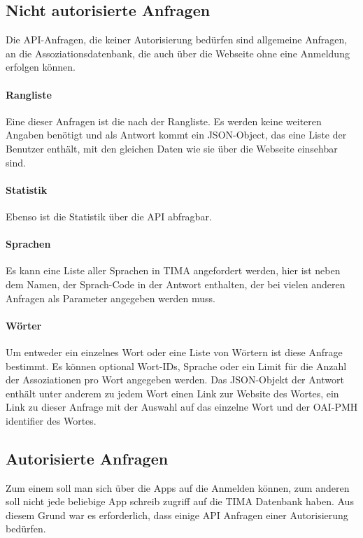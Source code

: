 \subsection{Nicht autorisierte Anfragen}
Die API-Anfragen, die keiner Autorisierung bedürfen sind allgemeine Anfragen, an die Assoziationsdatenbank, die auch über die Webseite ohne eine Anmeldung erfolgen können.

\paragraph{Rangliste} Eine dieser Anfragen ist die nach der Rangliste. Es werden keine weiteren Angaben benötigt und als Antwort kommt ein JSON-Object, das eine Liste der Benutzer enthält, mit den gleichen Daten wie sie über die Webseite einsehbar sind.

\paragraph{Statistik} Ebenso ist die Statistik über die API abfragbar.

\paragraph{Sprachen} Es kann eine Liste aller Sprachen in TIMA angefordert werden, hier ist neben dem Namen, der Sprach-Code in der Antwort enthalten, der bei vielen anderen Anfragen als Parameter angegeben werden muss.

\paragraph{Wörter} Um entweder ein einzelnes Wort oder eine Liste von Wörtern ist diese Anfrage bestimmt. Es können optional Wort-IDs, Sprache oder ein Limit für die Anzahl der Assoziationen pro Wort angegeben werden. Das JSON-Objekt der Antwort enthält unter anderem zu jedem Wort einen Link zur Website des Wortes, ein Link zu dieser Anfrage mit der Auswahl auf das einzelne Wort und der OAI-PMH identifier des Wortes.

\subsection{Autorisierte Anfragen}\label{subsec:autorisierte_anfragen}
Zum einem soll man sich über die Apps auf die Anmelden können, zum anderen soll nicht jede beliebige App schreib zugriff auf die TIMA Datenbank haben. Aus diesem Grund war es erforderlich, dass einige API Anfragen einer Autorisierung bedürfen.

